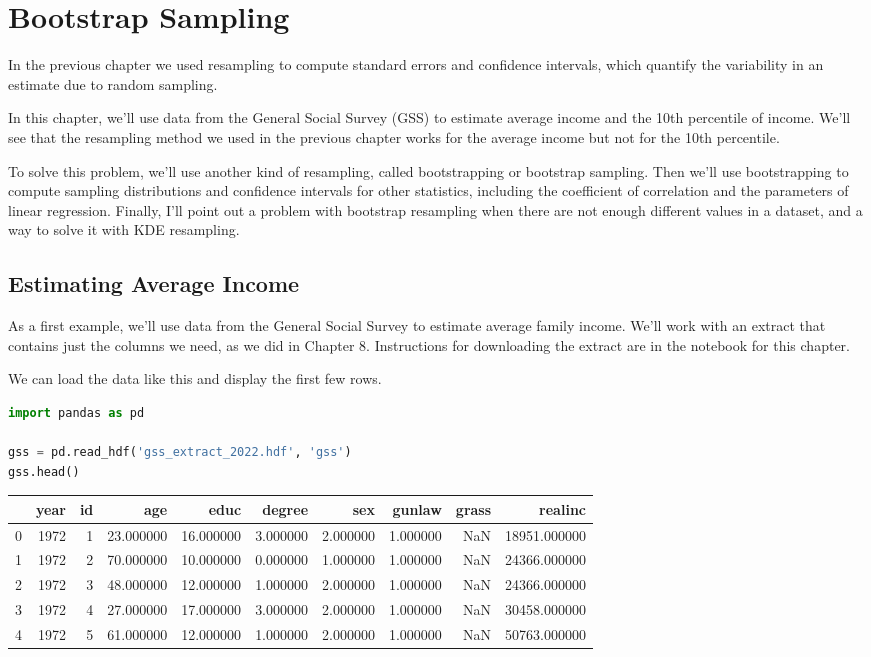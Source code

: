 \chapter{Bootstrap Sampling}\label{bootstrap-sampling}

In the previous chapter we used resampling to compute standard errors
and confidence intervals, which quantify the variability in an estimate
due to random sampling.

In this chapter, we'll use data from the General Social Survey (GSS) to
estimate average income and the 10th percentile of income. We'll see
that the resampling method we used in the previous chapter works for the
average income but not for the 10th percentile.

To solve this problem, we'll use another kind of resampling, called
bootstrapping or bootstrap sampling. Then we'll use bootstrapping to
compute sampling distributions and confidence intervals for other
statistics, including the coefficient of correlation and the parameters
of linear regression. Finally, I'll point out a problem with bootstrap
resampling when there are not enough different values in a dataset, and
a way to solve it with KDE resampling.

\section{Estimating Average Income}\label{estimating-average-income}

As a first example, we'll use data from the General Social Survey to
estimate average family income. We'll work with an extract that contains
just the columns we need, as we did in Chapter 8. Instructions for
downloading the extract are in the notebook for this chapter.

We can load the data like this and display the first few rows.

\begin{lstlisting}[language=Python,style=source]
import pandas as pd

gss = pd.read_hdf('gss_extract_2022.hdf', 'gss')
gss.head()
\end{lstlisting}

\begin{tabular}{lrrrrrrrrr}
\midrule
 & year & id & age & educ & degree & sex & gunlaw & grass & realinc \\
\midrule
0 & 1972 & 1 & 23.000000 & 16.000000 & 3.000000 & 2.000000 & 1.000000 & NaN & 18951.000000 \\
1 & 1972 & 2 & 70.000000 & 10.000000 & 0.000000 & 1.000000 & 1.000000 & NaN & 24366.000000 \\
2 & 1972 & 3 & 48.000000 & 12.000000 & 1.000000 & 2.000000 & 1.000000 & NaN & 24366.000000 \\
3 & 1972 & 4 & 27.000000 & 17.000000 & 3.000000 & 2.000000 & 1.000000 & NaN & 30458.000000 \\
4 & 1972 & 5 & 61.000000 & 12.000000 & 1.000000 & 2.000000 & 1.000000 & NaN & 50763.000000 \\
\midrule
\end{tabular}

